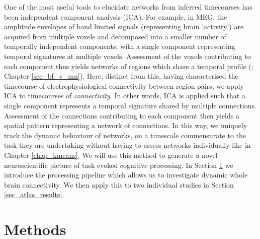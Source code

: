 One of the most useful tools to elucidate networks from inferred timecourses has been independent component analysis (ICA). For example, in MEG, the amplitude envelopes of band limited signals (representing brain ‘activity’) are acquired from multiple voxels and decomposed into a smaller number of temporally independent components, with a single component representing temporal signatures at multiple voxels. Assessment of the voxels contributing to each component thus yields networks of regions which share a temporal profile (\citealp{Brookes2011,Luckhoo2012,Hall2013}; Chapter \ref{sec_bf_v_mn}). Here, distinct from this, having characterised the timecourse of electrophysiological connectivity between region pairs, we apply ICA to timecourses of \textit{connectivity}. In other words, ICA is applied such that a single component represents a temporal signature shared by multiple connections. Assessment of the connections contributing to each component then yields a spatial pattern representing a network of connections. In this way, we uniquely track the dynamic behaviour of networks, on a timescale commensurate to the task they are undertaking without having to assess networks individually like in Chapter \ref{chap_kmeans}. We will use this method to generate a novel neuroscientific picture of task evoked cognitive processing. In Section \ref{sec_atlas_methods} we introduce the processing pipeline which allows us to investigate dynamic whole brain connectivity. We then apply this to two individual studies in Section \ref{sec_atlas_results}.

\section{Methods}\label{sec_atlas_methods}
